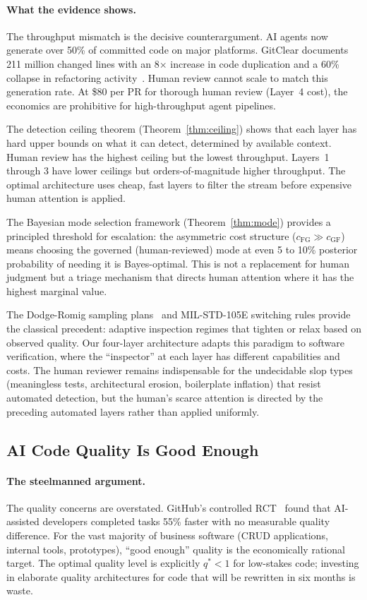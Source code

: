 \documentclass[11pt, a4paper, logo, copyright]{googledeepmind}
\begin{document}
\paragraph{What the evidence shows.}
The throughput mismatch is the decisive counterargument. AI agents now generate over 50\% of committed code on major platforms. GitClear documents 211 million changed lines with an 8$\times$ increase in code duplication and a 60\% collapse in refactoring activity~\citep{gitclear2025}. Human review cannot scale to match this generation rate. At \$80 per PR for thorough human review (Layer~4 cost), the economics are prohibitive for high-throughput agent pipelines.

The detection ceiling theorem (Theorem~\ref{thm:ceiling}) shows that each layer has hard upper bounds on what it can detect, determined by available context. Human review has the highest ceiling but the lowest throughput. Layers~1 through 3 have lower ceilings but orders-of-magnitude higher throughput. The optimal architecture uses cheap, fast layers to filter the stream before expensive human attention is applied.

The Bayesian mode selection framework (Theorem~\ref{thm:mode}) provides a principled threshold for escalation: the asymmetric cost structure ($c_{\mathrm{FG}} \gg c_{\mathrm{GF}}$) means choosing the governed (human-reviewed) mode at even 5 to 10\% posterior probability of needing it is Bayes-optimal. This is not a replacement for human judgment but a triage mechanism that directs human attention where it has the highest marginal value.

The Dodge-Romig sampling plans~\citep{dodge1929method} and MIL-STD-105E switching rules provide the classical precedent: adaptive inspection regimes that tighten or relax based on observed quality. Our four-layer architecture adapts this paradigm to software verification, where the ``inspector'' at each layer has different capabilities and costs. The human reviewer remains indispensable for the undecidable slop types (meaningless tests, architectural erosion, boilerplate inflation) that resist automated detection, but the human's scarce attention is directed by the preceding automated layers rather than applied uniformly.


\subsection{AI Code Quality Is Good Enough}
\label{sec:contrarian-quality}

\paragraph{The steelmanned argument.}
The quality concerns are overstated. GitHub's controlled RCT~\citep{github2024rct} found that AI-assisted developers completed tasks 55\% faster with no measurable quality difference. For the vast majority of business software (CRUD applications, internal tools, prototypes), ``good enough'' quality is the economically rational target. The optimal quality level is explicitly $q^* < 1$ for low-stakes code; investing in elaborate quality architectures for code that will be rewritten in six months is waste.
\end{document}

